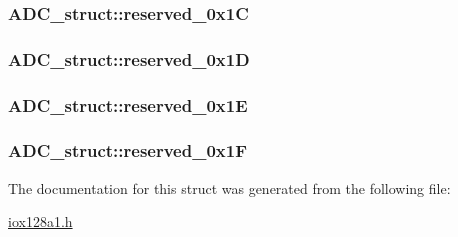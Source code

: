 \label{struct_a_d_c__struct_aa46edab8e54f50decd8b08f100488dc4}
\hypertarget{struct_a_d_c__struct_a6b195bdc170ca741b402b3b833c18b1b}{
\subsubsection[{reserved\_\-0x1C}]{ {\bf ADC\_\-struct::reserved\_\-0x1C}}}
\label{struct_a_d_c__struct_a6b195bdc170ca741b402b3b833c18b1b}
\hypertarget{struct_a_d_c__struct_a72c153a047bbe621defcfad3e73def0e}{
\subsubsection[{reserved\_\-0x1D}]{ {\bf ADC\_\-struct::reserved\_\-0x1D}}}
\label{struct_a_d_c__struct_a72c153a047bbe621defcfad3e73def0e}
\hypertarget{struct_a_d_c__struct_ad2a0f2fcad0290710dd7f8e2dc952867}{
\subsubsection[{reserved\_\-0x1E}]{ {\bf ADC\_\-struct::reserved\_\-0x1E}}}
\label{struct_a_d_c__struct_ad2a0f2fcad0290710dd7f8e2dc952867}
\hypertarget{struct_a_d_c__struct_aa039fe0ef21ecb10b97f9903f85b7c16}{
\subsubsection[{reserved\_\-0x1F}]{ {\bf ADC\_\-struct::reserved\_\-0x1F}}}
\label{struct_a_d_c__struct_aa039fe0ef21ecb10b97f9903f85b7c16}


The documentation for this struct was generated from the following file:\begin{DoxyCompactItemize}
\item 
\hyperlink{iox128a1_8h}{iox128a1.h}\end{DoxyCompactItemize}
